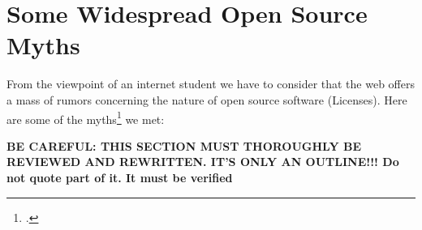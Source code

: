 %
%
%
%

%




\section{Some Widespread Open Source Myths}

From the viewpoint of an internet student we have to consider that the web
offers a mass of rumors concerning the nature of open source software
(Licenses). Here are some of the myths\footcite[At least one time even a
scientific legally discussing book is talking about the \enquote{myth around open
source licenses} - although only as part of  the title: cf][1ff,
especially 209ff]{GuiOvd2006a} we met:
 
\textbf{BE CAREFUL: THIS SECTION MUST THOROUGHLY BE REVIEWED AND REWRITTEN. 
IT'S ONLY AN OUTLINE!!! Do not quote part of it. It must be verified}

